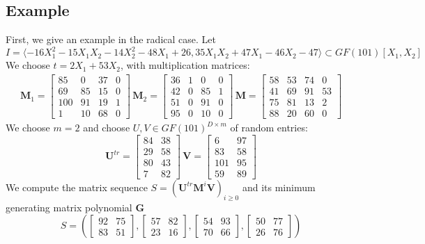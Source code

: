 \documentclass[12pt]{article}
\def\mG{\mathbf{G}}
\def\mM{\mathbf{M}}
\def\mU{\mathbf{U}}
\def\mV{\mathbf{V}}
\begin{document}
\subsection{Example}
First, we give an example in the radical case. Let
$$I = \langle -16X_1^2 - 15X_1X_2 - 14X_2^2 - 48X_1 + 26, 35X_1X_2 + 47X_1 - 46X_2 - 47 \rangle \subset GF(101)[X_1,X_2]$$
We choose $t = 2X_1 + 53 X_2$, with multiplication matrices:
\begin{align*}
\mM_1 = \begin{bmatrix}
 85&   0&  37&   0\\
 69&  85&  15&   0\\
100&  91&  19&   1\\
  1&  10&  68&   0
\end{bmatrix}\,
\mM_2 = \begin{bmatrix}
36&  1&  0&  0\\
42&  0& 85&  1\\
51&  0& 91&  0\\
95&  0& 10&  0
\end{bmatrix}\,
\mM = \begin{bmatrix}
58& 53& 74&  0\\
41& 69& 91& 53\\
75& 81& 13&  2\\
88& 20& 60&  0
\end{bmatrix}
\end{align*}
We choose $m = 2$ and choose $U,V \in GF(101)^{D\times m}$ of random
entries:
$$ \mU^{tr} = \begin{bmatrix}
84& 38\\
29& 58\\
80& 43\\
 7& 82
\end{bmatrix}\,
\mV = \begin{bmatrix}
  6&  97\\
 83&  58\\
101&  95\\
 59&  89
\end{bmatrix}
$$
We compute the matrix sequence $S = (\mU^{tr}\mM^i\mV)_{i\ge0}$ and its minimum generating matrix polynomial $\mG$
$$ S = (
\begin{bmatrix}
92& 75\\  
83& 51
\end{bmatrix},
\begin{bmatrix}
57& 82\\  
23& 16
\end{bmatrix},
\begin{bmatrix}
54& 93\\  
70& 66
\end{bmatrix},
\begin{bmatrix}
50& 77\\
26& 76
\end{bmatrix}
)$$
\end{document}
